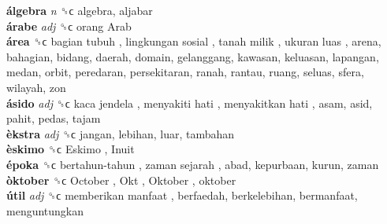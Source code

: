 \textbf{álgebra} \emph{n}  ␝ϲ  algebra, aljabar  \\
\textbf{árabe} \emph{adj}  ␝ϲ   orang Arab   \\
\textbf{área} ␝ϲ   bagian tubuh ,  lingkungan sosial ,  tanah milik ,  ukuran luas , arena, bahagian, bidang, daerah, domain, gelanggang, kawasan, keluasan, lapangan, medan, orbit, peredaran, persekitaran, ranah, rantau, ruang, seluas, sfera, wilayah, zon  \\
\textbf{ásido} \emph{adj}  ␝ϲ   kaca jendela ,  menyakiti hati ,  menyakitkan hati , asam, asid, pahit, pedas, tajam  \\
\textbf{èkstra} \emph{adj}  ␝ϲ  jangan, lebihan, luar, tambahan  \\
\textbf{èskimo} ␝ϲ   Eskimo ,  Inuit   \\
\textbf{époka} ␝ϲ   bertahun-tahun ,  zaman sejarah , abad, kepurbaan, kurun, zaman  \\
\textbf{òktober} ␝ϲ   October ,  Okt ,  Oktober , oktober  \\
\textbf{útil} \emph{adj}  ␝ϲ   memberikan manfaat , berfaedah, berkelebihan, bermanfaat, menguntungkan  \\

